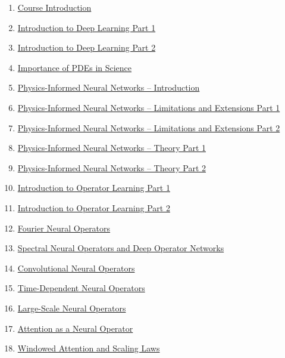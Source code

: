 \documentclass[11pt]{article}
\begin{document}
\begin{enumerate}
	\item  \href{https://mp.weixin.qq.com/s/L6M4wyrq6qLdMGgWZr5sZQ}{Course Introduction}%
	\item  \href{https://mp.weixin.qq.com/s/jzSg9A2xjd2pbwf5KHuOdQ}{Introduction to Deep Learning Part 1}%
	\item  \href{https://mp.weixin.qq.com/s/bI4f3TTcRPaslPKOgZPCLw}{Introduction to Deep Learning Part 2}%
	\item  \href{https://mp.weixin.qq.com/s/crJjMDhN14f1f4pXCK0Tdg}{Importance of PDEs in Science}%
	\item  \href{https://mp.weixin.qq.com/s/eUk_oUq5L3nFRKgrzhoOlg}{Physics-Informed Neural Networks – Introduction}%
	\item  \href{https://mp.weixin.qq.com/s/wi2b41lGtV4f2mGYjmA-vg}{Physics-Informed Neural Networks – Limitations and Extensions Part 1}%
	\item  \href{https://mp.weixin.qq.com/s/7jF7BzqcXnKkkxoVgzEqnQ}{Physics-Informed Neural Networks – Limitations and Extensions Part 2}%
	\item  \href{https://mp.weixin.qq.com/s/tehML7f5ePhv4JSmoTVkzg}{Physics-Informed Neural Networks – Theory Part 1}%
	\item  \href{https://mp.weixin.qq.com/s/dPkWxE-T78u5FxhD7oM7mQ}{Physics-Informed Neural Networks – Theory Part 2}%
	\item  \href{https://mp.weixin.qq.com/s/AZnPcYsaFFEeSRKwW8Vwtw}{Introduction to Operator Learning Part 1}%
	\item  \href{https://mp.weixin.qq.com/s/3-qM3ilyWNPOIgbHtDJr4g}{Introduction to Operator Learning Part 2}%
	\item  \href{https://mp.weixin.qq.com/s/sLLCTeCUd8sJJeAKVT3m_Q}{Fourier Neural Operators}%
	\item  \href{https://mp.weixin.qq.com/s/Rswrq2N3kFploGkRInWaXA}{Spectral Neural Operators and Deep Operator Networks}%
	\item  \href{https://mp.weixin.qq.com/s/fhFYN6m8wFu4NZpRner7Ww}{Convolutional Neural Operators}%
	\item  \href{https://mp.weixin.qq.com/s/zvWArq-bqaApqM9cyR5hlw}{Time-Dependent Neural Operators}%
	\item  \href{https://mp.weixin.qq.com/s/F4uQycm_I-vcd9JaGH8Xxw}{Large-Scale Neural Operators}%
	\item  \href{https://mp.weixin.qq.com/s/l24n5UsGqguVmhMPYW24tA}{Attention as a Neural Operator}%
	\item  \href{https://mp.weixin.qq.com/s/8WdeJmXRmm2pQAeIiPfeVw}{Windowed Attention and Scaling Laws}%

\end{enumerate}
\end{document}
